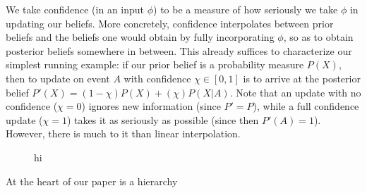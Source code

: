 We take confidence (in an input $\phi$) to be a measure of how seriously we take $\phi$ in updating our beliefs.
More concretely, confidence interpolates between prior beliefs and 
	the beliefs one would obtain by fully incorporating $\phi$, so as to obtain
	posterior beliefs somewhere in between. 
This already suffices to characterize our simplest running example:
if our prior belief is a probability measure $P(X)$, then to update on event $A$ with confidence $\chi \in [0,1]$ is to arrive at the posterior belief $P'(X) = (1-\chi) P(X) + (\chi) P(X|A)$. 
Note that an update with no confidence ($\chi{=}0$) ignores new information (since $P' \!=\! P$), while a full confidence update ($\chi{=}1$) takes it as seriously as possible (since then $P'(A) \!=\! 1$).  
However, there is much to it than linear interpolation. 


\begin{figure}
\centering
{}
\caption{%
	hi}
\end{figure}


At the heart of our paper is a hierarchy 

